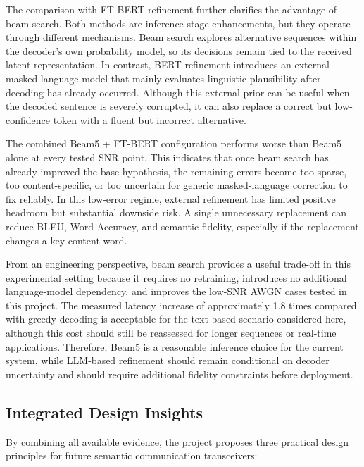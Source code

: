 The comparison with FT-BERT refinement further clarifies the advantage of beam search. Both methods are inference-stage enhancements, but they operate through different mechanisms. Beam search explores alternative sequences within the decoder’s own probability model, so its decisions remain tied to the received latent representation. In contrast, BERT refinement introduces an external masked-language model that mainly evaluates linguistic plausibility after decoding has already occurred. Although this external prior can be useful when the decoded sentence is severely corrupted, it can also replace a correct but low-confidence token with a fluent but incorrect alternative.

The combined Beam5 + FT-BERT configuration performs worse than Beam5 alone at every tested SNR point. This indicates that once beam search has already improved the base hypothesis, the remaining errors become too sparse, too content-specific, or too uncertain for generic masked-language correction to fix reliably. In this low-error regime, external refinement has limited positive headroom but substantial downside risk. A single unnecessary replacement can reduce BLEU, Word Accuracy, and semantic fidelity, especially if the replacement changes a key content word.

From an engineering perspective, beam search provides a useful trade-off in this experimental setting because it requires no retraining, introduces no additional language-model dependency, and improves the low-SNR AWGN cases tested in this project. The measured latency increase of approximately 1.8 times compared with greedy decoding is acceptable for the text-based scenario considered here, although this cost should still be reassessed for longer sequences or real-time applications. Therefore, Beam5 is a reasonable inference choice for the current system, while LLM-based refinement should remain conditional on decoder uncertainty and should require additional fidelity constraints before deployment.

\subsection{Integrated Design Insights}

By combining all available evidence, the project proposes three practical design principles for future semantic communication transceivers:

